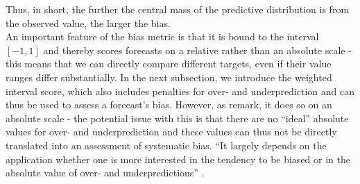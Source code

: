 Thus, in short, the further the central mass of the predictive distribution is from the observed value, the larger the bias.\\
An important feature of the bias metric is that it is bound to the interval $[-1,1]$ and thereby scores forecasts on a relative rather than an absolute scale - this means that we can directly compare different targets, even if their value ranges differ substantially.
In the next subsection, we introduce the weighted interval score, which also includes penalties for over- and underprediction and can thus be used to assess a forecast's bias. However, as \citep{bosse_evaluating_2022} remark, it does so on an absolute scale - the potential issue with this is that there are no ``ideal'' absolute values for over- and underprediction and these values can thus not be directly translated into an assessment of systematic bias.
``It largely depends on the application whether one is more interested in the tendency to be biased or in the absolute value of over- and underpredictions'' \citep{bosse_evaluating_2022}.
